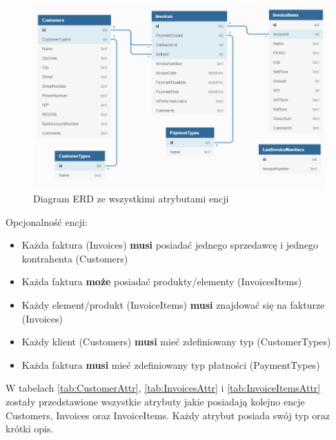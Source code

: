 \begin{figure}[ht!]
  \includegraphics[width=\linewidth]{Rysunki/ERDAttr.png}
  \caption{Diagram ERD ze wszystkimi atrybutami encji}
  \label{fig:erdDiagramAttr}
\end{figure}

\newpage
Opcjonalność encji:

\begin{itemize}
    \item Każda faktura (Invoices) \textbf{musi} posiadać jednego sprzedawcę i jednego kontrahenta (Customers)
    \item Każda faktura \textbf{może} posiadać produkty/elementy (InvoicesItems)
    \item Każdy element/produkt (InvoiceItems) \textbf{musi} znajdować się na fakturze (Invoices)
    \item Każdy klient (Customers) \textbf{musi} mieć zdefiniowany typ
    (CustomerTypes)
    \item Każda faktura \textbf{musi} mieć zdefiniowany typ płatności (PaymentTypes)
\end{itemize}

W tabelach \ref{tab:CustomerAttr}, \ref{tab:InvoicesAttr} i \ref{tab:InvoiceItemsAttr} zostały przedstawione wszystkie atrybuty jakie posiadają kolejno encje Customers, Invoices oraz InvoiceItems. Każdy atrybut posiada swój typ oraz krótki opis.

